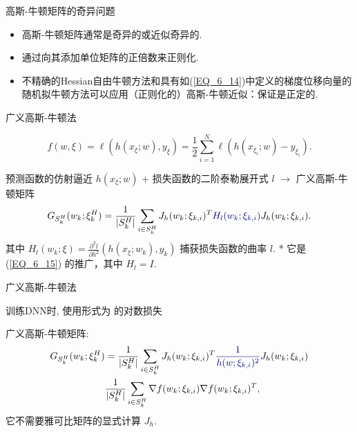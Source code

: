 \documentclass[handout]{beamer}
\begin{document}

\begin{frame}
{高斯-牛顿矩阵的奇异问题}

\begin{itemize}
\item {}
 高斯-牛顿矩阵通常是奇异的或近似奇异的.

\item {}
通过向其添加单位矩阵的正倍数来正则化.

\item {}
不精确的Hessian自由牛顿方法和具有如(\ref{EQ_6_14})中定义的梯度位移向量的随机拟牛顿方法可以应用（正则化的）高斯-牛顿近似：保证是正定的.
\end{itemize}
\end{frame}


\begin{frame}
{广义高斯-牛顿法}


$$
    f(w,\xi) = \ell(h(x_{\xi};w),y_{\xi})
    = \frac{1}{2} \sum_{i=1}^N \ell(h(x_{\xi_i};w) - y_{\xi_i}).
$$

 预测函数的仿射逼近 $h(x_{\xi};w)$ $+$ 损失函数的二阶泰勒展开式 $l$ $\longrightarrow$  广义高斯-牛顿矩阵
\begin{equation}\label{EQ_6_16}
G_{S_k^H}(w_k; \xi_k^H) = \frac{1}{|S_k^H|} \sum_{i\in S_k^H} J_h(w_k;\xi_{k,i})^{T} \dblue{H_l(w_k;\xi_{k,i})}J_h(w_k;\xi_{k,i}).
\end{equation}
其中 $H_l(w_k;\xi) = \frac{\partial^2 l }{\partial h^2}(h(x_{\xi}; w_k),y_k)$
捕获损失函数的曲率 $l$. * 它是 (\ref{EQ_6_15}) 的推广，其中 $H_l = I$.
\end{frame}

\begin{frame}
{广义高斯-牛顿法}

训练DNN时,
 使用形式为 
 的对数损失

广义高斯-牛顿矩阵:
\begin{equation}\label{EQ_6_17}
\begin{aligned}
G_{S_k^H}(w_k; \xi_k^H) & = \frac{1}{|S_k^H|} \sum_{i\in S_k^H} J_h(w_k;\xi_{k,i})^{T} \dblue{\frac{1}{h(w;\xi_{k,i})^2 }} J_h(w_k;\xi_{k,i}) \\
 & \frac{1}{|S_k^H|} \sum_{i\in S_k^H} \nabla f(w_k;\xi_{k,i}) \nabla f(w_k;\xi_{k,i})^{T} , \\
\end{aligned}
\end{equation}
它不需要雅可比矩阵的显式计算 $J_h$.

\end{frame}
\end{document}
